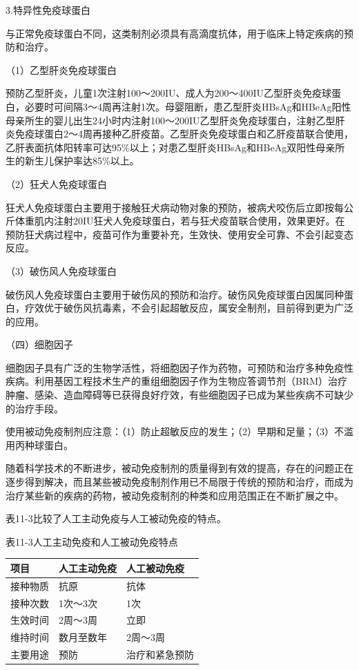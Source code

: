 3.特异性免疫球蛋白

与正常免疫球蛋白不同，这类制剂必须具有高滴度抗体，用于临床上特定疾病的预防和治疗。

（1）乙型肝炎免疫球蛋白

预防乙型肝炎，儿童1次注射100～200IU、成人为200～400IU乙型肝炎免疫球蛋白，必要时可间隔3～4周再注射1次。母婴阻断，患乙型肝炎HBsAg和HBeAg阳性母亲所生的婴儿出生24小时内注射100～200IU乙型肝炎免疫球蛋白，注射乙型肝炎免疫球蛋白2～4周再接种乙肝疫苗。乙型肝炎免疫球蛋白和乙肝疫苗联合使用，乙肝表面抗体阳转率可达95\%以上；对患乙型肝炎HBsAg和HBeAg双阳性母亲所生的新生儿保护率达85\%以上。

（2）狂犬人免疫球蛋白

狂犬人免疫球蛋白主要用于接触狂犬病动物对象的预防，被病犬咬伤后立即按每公斤体重肌内注射20IU狂犬人免疫球蛋白，若与狂犬疫苗联合使用，效果更好。在预防狂犬病过程中，疫苗可作为重要补充，生效快、使用安全可靠、不会引起变态反应。

（3）破伤风人免疫球蛋白

破伤风人免疫球蛋白主要用于破伤风的预防和治疗。破伤风免疫球蛋白因属同种蛋白，疗效优于破伤风抗毒素，不会引起超敏反应，属安全制剂，目前得到更为广泛的应用。

（四）细胞因子

细胞因子具有广泛的生物学活性，将细胞因子作为药物，可预防和治疗多种免疫性疾病。利用基因工程技术生产的重组细胞因子作为生物应答调节剂（BRM）治疗肿瘤、感染、造血障碍等已获得良好疗效，有些细胞因子已成为某些疾病不可缺少的治疗手段。

使用被动免疫制剂应注意：（1）防止超敏反应的发生；（2）早期和足量；（3）不滥用丙种球蛋白。

随着科学技术的不断进步，被动免疫制剂的质量得到有效的提高，存在的问题正在逐步得到解决，而且某些被动免疫制剂作用已不局限于传统的预防和治疗，而成为治疗某些新的疾病的药物，被动免疫制剂的种类和应用范围正在不断扩展之中。

表11-3比较了人工主动免疫与人工被动免疫的特点。

表11-3人工主动免疫和人工被动免疫特点

\begin{longtable}[]{@{}lll@{}}
\toprule
项目 & 人工主动免疫 & 人工被动免疫\tabularnewline
\midrule
\endhead
接种物质 & 抗原 & 抗体\tabularnewline
接种次数 & 1次～3次 & 1次\tabularnewline
生效时间 & 2周～3周 & 立即\tabularnewline
维持时间 & 数月至数年 & 2周～3周\tabularnewline
主要用途 & 预防 & 治疗和紧急预防\tabularnewline
\bottomrule
\end{longtable}

